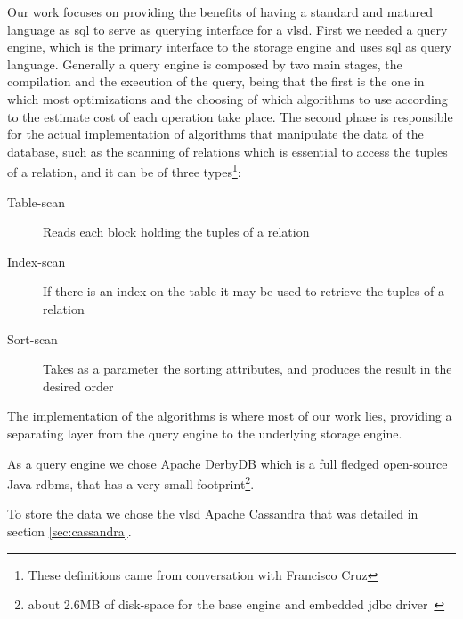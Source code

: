 Our work focuses on providing the benefits of having a standard and matured language as \ac{sql} to serve as querying interface for a \ac{vlsd}. First we needed a query engine, which is the primary interface to the storage engine and uses \ac{sql} as query language. Generally a query engine is composed by two main stages, the compilation and the execution of the query, being that the first is the one in which most optimizations and the choosing of which algorithms to use according to the estimate cost of each operation take place. The second phase is responsible for the actual implementation of algorithms that manipulate the data of the database, such as the scanning of relations which is essential to access the tuples of a relation, and it can be of three types\footnote{These definitions came from conversation with Francisco Cruz}:

\begin{description}
	\item[Table-scan] Reads each block holding the tuples of a relation
	\item[Index-scan] If there is an index on the table it may be used to retrieve the tuples of a relation 
	\item[Sort-scan] Takes as a parameter the sorting attributes, and produces the result in the desired order
\end{description}

The implementation of the algorithms is where most of our work lies, providing a separating layer from the query engine to the underlying storage engine.

As a query engine we chose Apache DerbyDB which is a full fledged open-source Java \ac{rdbms}, that has a very small footprint\footnote{about 2.6MB of disk-space for the base engine and embedded \ac{jdbc} driver~\cite{derbySite}}.

To store the data we chose the \ac{vlsd} Apache Cassandra that was detailed in section \ref{sec:cassandra}.

